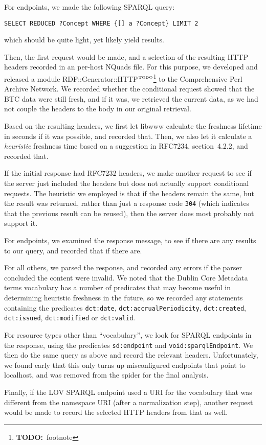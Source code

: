 \documentclass{article}
\newcommand{\rdfterm}[1]{\texttt{#1}}
\newcommand{\httph}[1]{\texttt{#1}}
\newcommand{\todo}[1]{\ensuremath{^{\textrm{\tiny{TODO}\normalsize}}}\footnote{\textbf{TODO:}~#1}}
\begin{document}
\begin{appendices}
For endpoints, we made the following SPARQL query:
\begin{verbatim}
SELECT REDUCED ?Concept WHERE {[] a ?Concept} LIMIT 2
\end{verbatim}
which should be quite light, yet likely yield results.

Then, the first request would be made, and a selection of the
resulting HTTP headers recorded in an per-host NQuads file. For this
purpose, we developed and released a module
RDF::Generator::HTTP\todo{footnote} to the Comprehensive Perl Archive
Network. We recorded whether the conditional request showed that the
BTC data were still fresh, and if it was, we retrieved the current
data, as we had not couple the headers to the body in our original
retrieval.

Based on the resulting headers, we first let libwww calculate the
freshness lifetime in seconds if it was possible, and recorded
that. Then, we also let it calculate a \emph{heuristic} freshness
time based on a suggestion in RFC7234, section~4.2.2, and recorded that.

If the initial response had RFC7232 headers, we make another
request to see if the server just included the headers but does not
actually support conditional requests. The heuristic we employed is
that if the headers remain the same, but the result was returned,
rather than just a response code \httph{304} (which indicates that the
previous result can be reused), then the server does most probably not
support it.

For endpoints, we examined the response message, to see if there are
any results to our query, and recorded that if there are.

For all others, we parsed the response, and recorded any errors if the
parser concluded the content were invalid. We noted that the Dublin Core
Metadata terms vocabulary has a number of predicates that may become
useful in determining heuristic freshness in the future, so we
recorded any statements containing the predicates \rdfterm{dct:date},
\rdfterm{dct:accrualPeriodicity}, \rdfterm{dct:created},
\rdfterm{dct:issued}, \rdfterm{dct:modified} or \rdfterm{dct:valid}.

For resource types other than ``vocabulary'', we look for SPARQL
endpoints in the response, using the predicates \rdfterm{sd:endpoint}
and \rdfterm{void:sparqlEndpoint}. We then do the same query as above
and record the relevant headers. Unfortunately, we found early that
this only turns up misconfigured endpoints that point to localhost,
and was removed from the spider for the final analysis.

Finally, if the LOV SPARQL endpoint used a URI for the vocabulary that
was different from the namespace URI (after a normalization step),
another request would be made to record the selected HTTP headers from
that as well.
\end{appendices}
\end{document}
